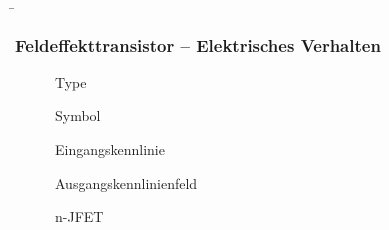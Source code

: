 \begin{frame}
    \b{ \frametitle{Feldeffekttransistor -- Elektrisches Verhalten}
        \begin{table}[H]
            \begin{figure}[H]
                \begin{minipage}[c]{0.1\textwidth}
                    \centering
                    Type
                \end{minipage}
                \begin{minipage}[c]{0.2\textwidth}
                    \centering
                    Symbol
                \end{minipage}
                \begin{minipage}[c]{0.33\textwidth}
                    \centering
                    Eingangskennlinie
                \end{minipage}
                \begin{minipage}[c]{0.33\textwidth}
                    \centering
                    Ausgangskennlinienfeld
                \end{minipage}
            \end{figure}
            \begin{figure}[H]
                \begin{minipage}[c]{0.1\textwidth}
                \centering
                n-JFET
                \end{minipage}
                \begin{minipage}[c]{0.2\textwidth}
                    \centering
                    
                    \end{minipage}
                \begin{minipage}[c]{0.33\textwidth}
                \centering
                  
                \end{minipage}
                \begin{minipage}[c]{0.33\textwidth}
                \centering
                
                \end{minipage}
            \end{figure}
            \begin{figure}[H]
                \begin{minipage}[c]{0.1\textwidth}

\end{minipage}
\end{figure}
\end{table}}
\end{frame}
